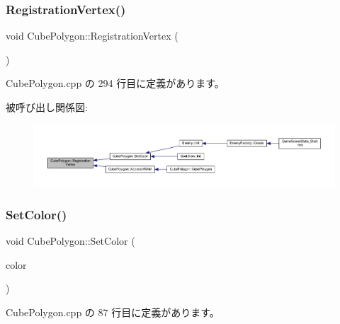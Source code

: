 \subsubsection{\texorpdfstring{Registration\+Vertex()}{RegistrationVertex()}}
{\footnotesize\ttfamily void Cube\+Polygon\+::\+Registration\+Vertex (\begin{DoxyParamCaption}{ }\end{DoxyParamCaption})\hspace{0.3cm}{\ttfamily [private]}}



 Cube\+Polygon.\+cpp の 294 行目に定義があります。

被呼び出し関係図\+:\nopagebreak
\begin{figure}[H]
\begin{center}
\leavevmode
\includegraphics[width=350pt]{class_cube_polygon_adde345ed591e3e81abcffdcac5068f98_icgraph}
\end{center}
\end{figure}
\mbox{\label{class_cube_polygon_acf6a30c30c22dd887ed570db6cbe285d}} 
\subsubsection{\texorpdfstring{Set\+Color()}{SetColor()}}
{\footnotesize\ttfamily void Cube\+Polygon\+::\+Set\+Color (\begin{DoxyParamCaption}\item[{\mbox{\hyperlink{_vector3_d_8h_a680c30c4a07d86fe763c7e01169cd6cc}{X\+Color4}}}]{color }\end{DoxyParamCaption})}



 Cube\+Polygon.\+cpp の 87 行目に定義があります。

